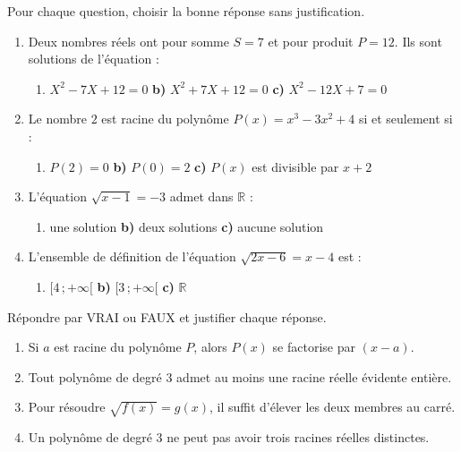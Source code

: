 \documentclass[11pt]{article}
\begin{document}
\begin{exercice}
Pour chaque question, choisir la bonne réponse sans justification.
\begin{enumerate}
\item Deux nombres réels ont pour somme $S = 7$ et pour produit $P = 12$. Ils sont solutions de l'équation :
\begin{enumerate}
\item $X^2 - 7X + 12 = 0$ \qquad \textbf{b)} $X^2 + 7X + 12 = 0$ \qquad \textbf{c)} $X^2 - 12X + 7 = 0$
\end{enumerate}
\item Le nombre $2$ est racine du polynôme $P(x) = x^3 - 3x^2 + 4$ si et seulement si :
\begin{enumerate}
\item $P(2) = 0$ \qquad \textbf{b)} $P(0) = 2$ \qquad \textbf{c)} $P(x)$ est divisible par $x + 2$
\end{enumerate}
\item L'équation $\sqrt{x - 1} = -3$ admet dans $\mathbb{R}$ :
\begin{enumerate}
\item une solution \qquad \textbf{b)} deux solutions \qquad \textbf{c)} aucune solution
\end{enumerate}
\item L'ensemble de définition de l'équation $\sqrt{2x - 6} = x - 4$ est :
\begin{enumerate}
\item $[4\,;+\infty[$ \qquad \textbf{b)} $[3\,;+\infty[$ \qquad \textbf{c)} $\mathbb{R}$
\end{enumerate}
\end{enumerate}
\end{exercice}

\begin{exercice}
Répondre par VRAI ou FAUX et justifier chaque réponse.
\begin{enumerate}
\item Si $a$ est racine du polynôme $P$, alors $P(x)$ se factorise par $(x - a)$.
\item Tout polynôme de degré $3$ admet au moins une racine réelle évidente entière.
\item Pour résoudre $\sqrt{f(x)} = g(x)$, il suffit d'élever les deux membres au carré.
\item Un polynôme de degré $3$ ne peut pas avoir trois racines réelles distinctes.
\end{enumerate}
\end{exercice}
\end{document}
